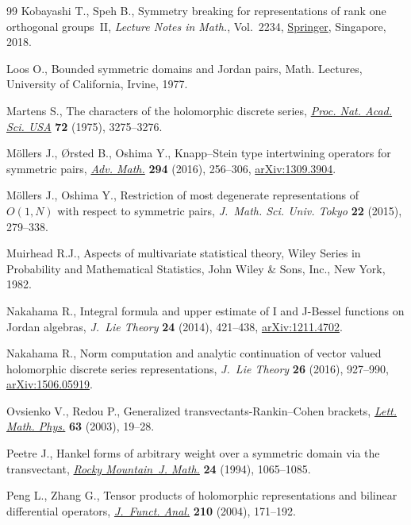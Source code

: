 \documentclass[pdftex]{sigma}
\numberwithin{equation}{section}
\begin{document}
\begin{thebibliography}{99}
Kobayashi T., Speh B., Symmetry breaking for representations of rank one
 orthogonal groups~{II}, \textit{Lecture Notes in Math.}, Vol.~2234, \href{https://doi.org/10.1007/978-981-13-2901-2}{Springer},
 Singapore, 2018.

Loos O., Bounded symmetric domains and {J}ordan pairs, Math. Lectures,
 University of California, Irvine, 1977.

Martens S., The characters of the holomorphic discrete series, \href{https://doi.org/10.1073/pnas.72.9.3275}{\textit{Proc.
 Nat. Acad. Sci. USA}} \textbf{72} (1975), 3275--3276.

M\"{o}llers J., {\O}rsted B., Oshima Y., Knapp--{S}tein type intertwining
 operators for symmetric pairs, \href{https://doi.org/10.1016/j.aim.2016.02.024}{\textit{Adv. Math.}} \textbf{294} (2016),
 256--306, \href{https://arxiv.org/abs/1309.3904}{arXiv:1309.3904}.

M\"{o}llers J., Oshima Y., Restriction of most degenerate representations of
 {$O(1,N)$} with respect to symmetric pairs, \textit{J.~Math. Sci. Univ.
 Tokyo} \textbf{22} (2015), 279--338.

Muirhead R.J., Aspects of multivariate statistical theory, Wiley Series in
 Probability and Mathematical Statistics, John Wiley \& Sons, Inc., New York,
 1982.

Nakahama R., Integral formula and upper estimate of {I} and {J}-{B}essel
 functions on {J}ordan algebras, \textit{J.~Lie Theory} \textbf{24} (2014),
 421--438, \href{https://arxiv.org/abs/1211.4702}{arXiv:1211.4702}.

Nakahama R., Norm computation and analytic continuation of vector valued
 holomorphic discrete series representations, \textit{J.~Lie Theory}
 \textbf{26} (2016), 927--990, \href{https://arxiv.org/abs/1506.05919}{arXiv:1506.05919}.

Ovsienko V., Redou P., Generalized transvectants-{R}ankin--{C}ohen brackets,
 \href{https://doi.org/10.1023/A:1022956710255}{\textit{Lett. Math. Phys.}} \textbf{63} (2003), 19--28.

Peetre J., Hankel forms of arbitrary weight over a symmetric domain via the
 transvectant, \href{https://doi.org/10.1216/rmjm/1181072389}{\textit{Rocky Mountain~J. Math.}} \textbf{24} (1994),
 1065--1085.

Peng L., Zhang G., Tensor products of holomorphic representations and bilinear
 differential operators, \href{https://doi.org/10.1016/j.jfa.2003.09.006}{\textit{J.~Funct. Anal.}} \textbf{210} (2004),
 171--192.


\end{thebibliography}
\end{document}
